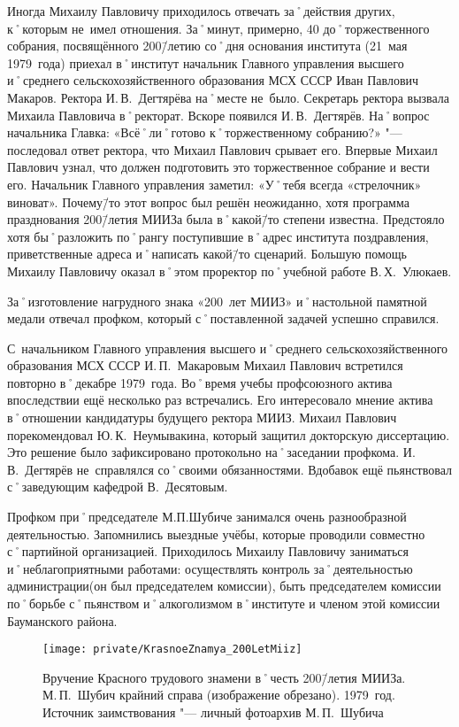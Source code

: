 Иногда Михаилу Павловичу приходилось отвечать за˚действия других, к˚которым не~имел отношения. За˚минут, примерно, 40 до˚торжественного собрания, посвящённого 200\=/летию со˚дня основания института (21~мая 1979~года) приехал в˚институт начальник Главного управления высшего и˚среднего сельскохозяйственного образования МСХ СССР Иван Павлович Макаров. Ректора И.\,В.~Дегтярёва на˚месте не~было. Секретарь ректора вызвала Михаила Павловича в˚ректорат. Вскоре появился И.\,В.~Дегтярёв. На˚вопрос начальника Главка: «Всё˚ли˚готово к˚торжественному собранию?» "--- последовал ответ ректора, что Михаил Павлович срывает его. Впервые Михаил Павлович узнал, что должен подготовить это торжественное собрание и вести его. Начальник Главного управления заметил: «У˚тебя всегда «стрелочник» виноват». Почему\=/то этот вопрос был решён неожиданно, хотя программа празднования 200\=/летия МИИЗа была в˚какой\=/то степени известна. Предстояло хотя бы˚разложить по˚рангу поступившие в˚адрес института поздравления, приветственные адреса и˚написать какой\=/то сценарий. Большую помощь Михаилу Павловичу оказал в˚этом проректор по˚учебной работе В.\,Х.~Улюкаев.

За˚изготовление нагрудного знака «200~лет МИИЗ» и˚настольной памятной медали отвечал профком, который с˚поставленной задачей успешно справился.

С~начальником Главного управления высшего и˚среднего сельскохозяйственного образования МСХ СССР И.\,П.~Макаровым Михаил Павлович встретился повторно в˚декабре 1979~года. Во˚время учебы профсоюзного актива впоследствии ещё несколько раз встречались. Его интересовало мнение актива в˚отношении кандидатуры будущего ректора МИИЗ. Михаил Павлович порекомендовал Ю.\,К.~Неумывакина, который защитил докторскую диссертацию. Это решение было зафиксировано протокольно на˚заседании профкома. И.\,В.~Дегтярёв не~справлялся со˚своими обязанностями. Вдобавок ещё пьянствовал с˚заведующим кафедрой В.~Десятовым.

Профком при˚председателе М.П.Шубиче занимался очень разнообразной деятельностью. Запомнились выездные учёбы, которые проводили совместно с˚партийной организацией. Приходилось Михаилу Павловичу заниматься и˚неблагоприятными работами: осуществлять контроль за˚деятельностью администрации(он был председателем комиссии), быть председателем комиссии по˚борьбе с˚пьянством и˚алкоголизмом в˚институте и членом этой комиссии Бауманского района.

\begin{figure}[h]
\texttt{[image: private/KrasnoeZnamya\_200LetMiiz]}
\caption[Вручение Красного трудового знамени в˚честь 200\=/летия \mbox{МИИЗа}. М.\,П.~Шубич крайний справа (изображение обрезано). 1979~год]{Вручение Красного трудового знамени в˚честь 200\=/летия \mbox{МИИЗа}. М.\,П.~Шубич крайний справа (изображение обрезано). 1979~год. Источник заимствования "--- личный фотоархив М.\,П.~Шубича}
\label{fig:KrasnoeZnamya_200LetMiiz}
\end{figure}

